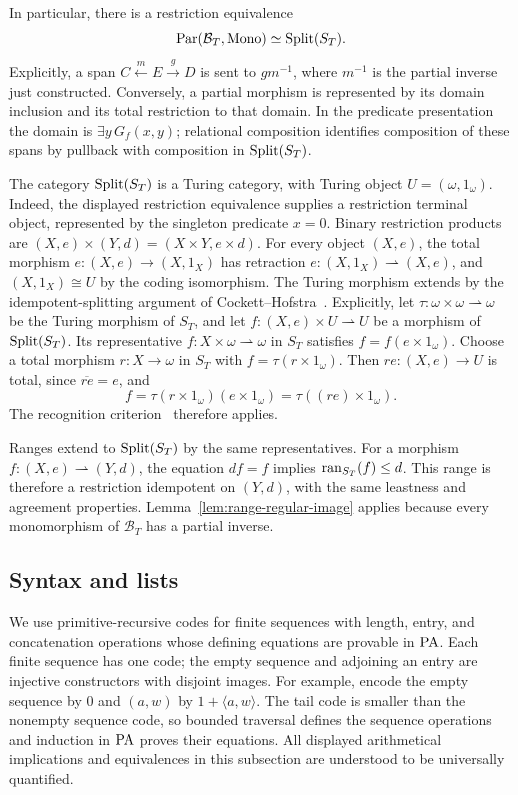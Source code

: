In particular, there is a restriction equivalence
\[
 \operatorname{Par}(\mathcal B_T,\operatorname{Mono})\simeq\operatorname{Split}(S_T).
\]
Explicitly, a span $C\xleftarrow{m}E\xrightarrow{g}D$ is sent
to $gm^{-1}$, where $m^{-1}$ is the partial inverse just constructed.
Conversely, a partial morphism is represented by its domain
inclusion and its total restriction to that domain. In the predicate
presentation the domain is $\exists y\,G_f(x,y)$; relational
composition identifies composition of these spans by pullback with
composition in $\operatorname{Split}(S_T)$.

The category $\operatorname{Split}(S_T)$ is a Turing category,
with Turing object $U=(\omega,1_\omega)$.
Indeed, the displayed restriction equivalence supplies a restriction
terminal object, represented by the singleton predicate $x=0$.
Binary restriction products are
$(X,e)\times(Y,d)=(X\times Y,e\times d)$.
For every object $(X,e)$, the total morphism
$e:(X,e)\to(X,1_X)$ has retraction
$e:(X,1_X)\rightharpoonup(X,e)$, and $(X,1_X)\cong U$
by the coding isomorphism.
The Turing morphism extends by the idempotent-splitting argument
of Cockett--Hofstra~\cite[Section 3.5]{CockettHofstra}.
Explicitly, let $\tau:\omega\times\omega\rightharpoonup\omega$
be the Turing morphism of $S_T$, and let
$f:(X,e)\times U\rightharpoonup U$ be a morphism of $\operatorname{Split}(S_T)$.
Its representative $f:X\times\omega\rightharpoonup\omega$ in $S_T$
satisfies $f=f(e\times1_\omega)$. Choose a total morphism
$r:X\to\omega$ in $S_T$ with $f=\tau(r\times1_\omega)$.
Then $re:(X,e)\to U$ is total, since $\overline{re}=e$, and
\[
 f=\tau(r\times1_\omega)(e\times1_\omega)
   =\tau((re)\times1_\omega).
\]
The recognition criterion~\cite[Theorem 3.4]{CockettHofstra}
therefore applies.

Ranges extend to $\operatorname{Split}(S_T)$ by the same representatives.
For a morphism $f:(X,e)\rightharpoonup(Y,d)$, the equation
$df=f$ implies $\operatorname{ran}_{S_T}(f)\leq d$. This range is therefore
a restriction idempotent on $(Y,d)$, with the same leastness
and agreement properties. Lemma~\ref{lem:range-regular-image}
applies because every monomorphism of $\mathcal B_T$ has a
partial inverse.

\subsection{Syntax and lists}
\label{sec:st-parameterized-syntax}

We use primitive-recursive codes for finite sequences with length,
entry, and concatenation operations whose defining equations are
provable in $\mathrm{PA}$. Each finite sequence has one code; the empty
sequence and adjoining an entry are injective constructors with
disjoint images. For example, encode the empty sequence by $0$
and $(a,w)$ by $1+\langle a,w\rangle$. The tail code is smaller
than the nonempty sequence code, so bounded traversal defines the
sequence operations and induction in $\mathrm{PA}$ proves their equations.
All displayed arithmetical implications and equivalences in this
subsection are understood to be universally quantified.

